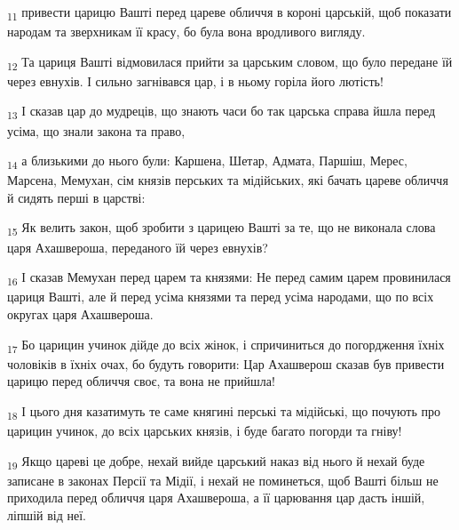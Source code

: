 \begin{tcolorbox}
\textsubscript{11} привести царицю Вашті перед цареве обличчя в короні царській, щоб показати народам та зверхникам її красу, бо була вона вродливого вигляду.
\end{tcolorbox}
\begin{tcolorbox}
\textsubscript{12} Та цариця Вашті відмовилася прийти за царським словом, що було передане їй через евнухів. І сильно загнівався цар, і в ньому горіла його лютість!
\end{tcolorbox}
\begin{tcolorbox}
\textsubscript{13} І сказав цар до мудреців, що знають часи бо так царська справа йшла перед усіма, що знали закона та право,
\end{tcolorbox}
\begin{tcolorbox}
\textsubscript{14} а близькими до нього були: Каршена, Шетар, Адмата, Паршіш, Мерес, Марсена, Мемухан, сім князів перських та мідійських, які бачать цареве обличчя й сидять перші в царстві:
\end{tcolorbox}
\begin{tcolorbox}
\textsubscript{15} Як велить закон, щоб зробити з царицею Вашті за те, що не виконала слова царя Ахашвероша, переданого їй через евнухів?
\end{tcolorbox}
\begin{tcolorbox}
\textsubscript{16} І сказав Мемухан перед царем та князями: Не перед самим царем провинилася цариця Вашті, але й перед усіма князями та перед усіма народами, що по всіх округах царя Ахашвероша.
\end{tcolorbox}
\begin{tcolorbox}
\textsubscript{17} Бо царицин учинок дійде до всіх жінок, і спричиниться до погордження їхніх чоловіків в їхніх очах, бо будуть говорити: Цар Ахашверош сказав був привести царицю перед обличчя своє, та вона не прийшла!
\end{tcolorbox}
\begin{tcolorbox}
\textsubscript{18} І цього дня казатимуть те саме княгині перські та мідійські, що почують про царицин учинок, до всіх царських князів, і буде багато погорди та гніву!
\end{tcolorbox}
\begin{tcolorbox}
\textsubscript{19} Якщо цареві це добре, нехай вийде царський наказ від нього й нехай буде записане в законах Персії та Мідії, і нехай не поминеться, щоб Вашті більш не приходила перед обличчя царя Ахашвероша, а її царювання цар дасть іншій, ліпшій від неї.
\end{tcolorbox}

